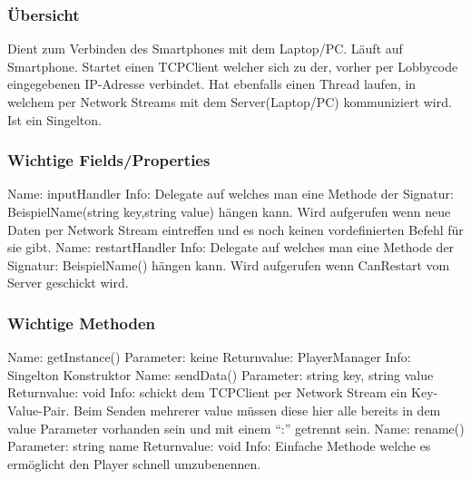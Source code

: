 \subsubsection{Übersicht}
Dient zum Verbinden des Smartphones mit dem Laptop/PC. Läuft auf Smartphone. Startet einen TCPClient welcher sich zu der, vorher per Lobbycode eingegebenen IP-Adresse verbindet. Hat ebenfalls einen Thread laufen, in welchem per Network Streams mit dem Server(Laptop/PC) kommuniziert wird. Ist ein Singelton.
\subsubsection{Wichtige Fields/Properties}
Name: inputHandler
\newline
Info: Delegate auf welches man eine Methode der Signatur: BeispielName(string key,string value) hängen kann. Wird aufgerufen wenn neue Daten per Network Stream eintreffen und es noch keinen vordefinierten Befehl für sie gibt.
\newline \newline
Name: restartHandler
\newline
Info: Delegate auf welches man eine Methode der Signatur: BeispielName() hängen kann. Wird aufgerufen wenn CanRestart vom Server geschickt wird.
\newline
\subsubsection{Wichtige Methoden}
Name: getInstance()
\newline
Parameter: keine
\newline
Returnvalue: PlayerManager
\newline
Info: Singelton Konstruktor
\newline \newline
Name: sendData()
\newline
Parameter: string key, string value
\newline
Returnvalue: void
\newline
Info: schickt dem TCPClient per Network Stream ein Key-Value-Pair. Beim Senden mehrerer value müssen diese hier alle bereits in dem value Parameter vorhanden sein und mit einem “:” getrennt sein.
\newline \newline
Name: rename()
\newline 
Parameter: string name
\newline
Returnvalue: void
\newline
Info: Einfache Methode welche es ermöglicht den Player schnell umzubenennen.
\newline 
